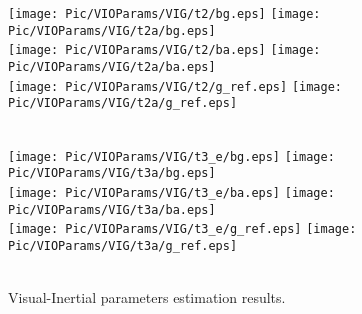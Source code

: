 \documentclass[journal,article,submit,moreauthors,pdftex]{Definitions/mdpi}
\begin{document}
\begin{figure}[H]
	\centering
	\texttt{[image: Pic/VIOParams/VIG/t2/bg.eps]}
	\texttt{[image: Pic/VIOParams/VIG/t2a/bg.eps]} \\
	\texttt{[image: Pic/VIOParams/VIG/t2/ba.eps]}
	\texttt{[image: Pic/VIOParams/VIG/t2a/ba.eps]} \\
	\texttt{[image: Pic/VIOParams/VIG/t2/g\_ref.eps]}
	\texttt{[image: Pic/VIOParams/VIG/t2a/g\_ref.eps]} \\
	 \\
\end{figure}

\begin{figure}[H]
	\centering
	\texttt{[image: Pic/VIOParams/VIG/t3\_e/bg.eps]}
	\texttt{[image: Pic/VIOParams/VIG/t3a/bg.eps]} \\
	\texttt{[image: Pic/VIOParams/VIG/t3\_e/ba.eps]}
	\texttt{[image: Pic/VIOParams/VIG/t3a/ba.eps]} \\
	\texttt{[image: Pic/VIOParams/VIG/t3\_e/g\_ref.eps]}
	\texttt{[image: Pic/VIOParams/VIG/t3a/g\_ref.eps]} \\
	 \\
	\caption{Visual-Inertial parameters estimation results.}
	\label{VIOParams}
\end{figure}
\end{document}
